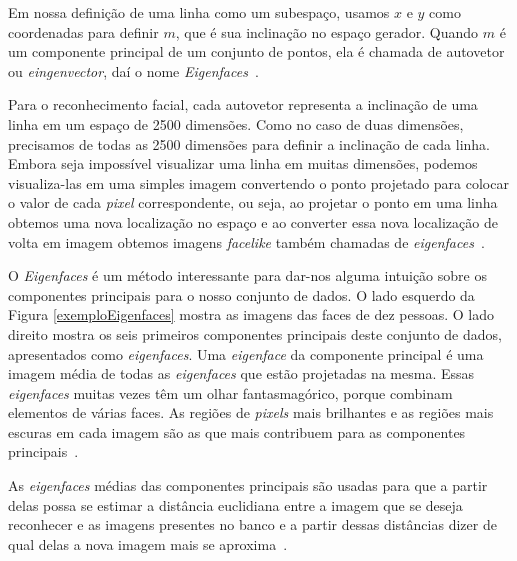 Em nossa definição de uma linha como um subespaço, usamos $\displaystyle x$ e $\displaystyle y$ como coordenadas para definir $\displaystyle m$, que é sua inclinação no espaço gerador. Quando $\displaystyle m$ é um componente principal de um conjunto de pontos, ela é chamada de autovetor ou \textit{eingenvector}, daí o nome \textit{Eigenfaces}~\cite{hewitt}. 

Para o reconhecimento facial, cada autovetor representa a inclinação de uma linha em um espaço de 2500 dimensões. Como no caso de duas dimensões, precisamos de todas as 2500 dimensões para definir a inclinação de cada linha. Embora seja impossível visualizar uma linha em muitas dimensões, podemos visualiza-las em uma simples imagem convertendo o ponto projetado para colocar o valor de cada \textit{pixel} correspondente, ou seja, ao projetar o ponto em uma linha obtemos uma nova localização no espaço e ao converter essa nova localização de volta em imagem obtemos imagens \textit{facelike} também chamadas de \textit{eigenfaces}~\cite{hewitt,turkpentland}.

O \textit{Eigenfaces} é um método interessante para dar-nos alguma intuição sobre os componentes principais para o nosso conjunto de dados. O lado esquerdo da Figura \ref{exemploEigenfaces} mostra as imagens das faces de dez pessoas. O lado direito  mostra os seis primeiros componentes principais deste conjunto de dados, apresentados como \textit{eigenfaces}. Uma \textit{eigenface} da componente principal é uma imagem média de todas as \textit{eigenfaces} que estão projetadas na mesma. Essas \textit{eigenfaces} muitas vezes têm um olhar fantasmagórico, porque combinam elementos de várias faces. As regiões de \textit{pixels} mais brilhantes e as regiões mais escuras em cada imagem são as que mais contribuem para as componentes principais~\cite{hewitt}. 

As \textit{eigenfaces} médias das componentes principais são usadas para que a partir delas possa se estimar a distância euclidiana entre a imagem que se deseja reconhecer e as imagens presentes no banco e a partir dessas distâncias dizer de qual delas a nova imagem mais se aproxima~\cite{turkpentland}.

